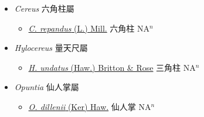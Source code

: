 
  \begin{itemize}
 \item[] \textit{Cereus} 六角柱屬
                    
  \begin{itemize}
        \item[] \href{http://www.theplantlist.org/tpl1.1/search?q=Cereus+repandus}{\textit{C. repandus} (L.) Mill.}   六角柱 NA$^n$
  \end{itemize}
 \item[] \textit{Hylocereus} 量天尺屬
                    
  \begin{itemize}
        \item[] \href{http://www.theplantlist.org/tpl1.1/search?q=Hylocereus+undatus}{\textit{H. undatus} (Haw.) Britton \& Rose}   三角柱 NA$^n$
  \end{itemize}
 \item[] \textit{Opuntia} 仙人掌屬
                    
  \begin{itemize}
        \item[] \href{http://www.theplantlist.org/tpl1.1/search?q=Opuntia+dillenii}{\textit{O. dillenii} (Ker) Haw.}   仙人掌 NA$^n$
  \end{itemize}
  \end{itemize}
